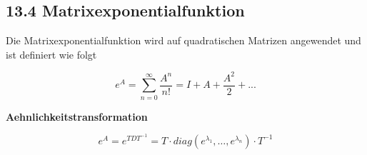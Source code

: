 \subsection{13.4 Matrixexponentialfunktion}{
\vskip1pt

Die Matrixexponentialfunktion wird auf quadratischen Matrizen angewendet und ist definiert wie folgt\par

\vspace{-12pt}
\begin{center}
\[e^{A} = \sum_{n=0}^\infty\frac{A^n}{n!}= I + A + \frac{A^2}{2} + ...\]
\end{center}

\textbf{Aehnlichkeitstransformation} \par\vspace{-3pt}
\[e^A = e^{TDT^{-1}} = T\cdot diag(e^{\lambda_1}, \hdots, e^{\lambda_n})\cdot T^{-1}\]

}
\WhiteSpace